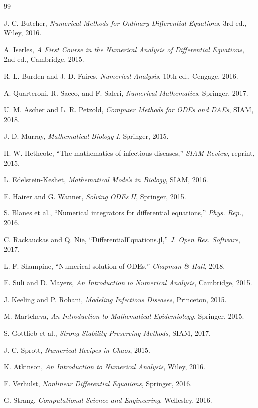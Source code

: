 \documentclass{article}
\begin{document}
\begin{thebibliography}{99}

J. C. Butcher,
\textit{Numerical Methods for Ordinary Differential Equations},
3rd ed., Wiley, 2016.

A. Iserles,
\textit{A First Course in the Numerical Analysis of Differential Equations},
2nd ed., Cambridge, 2015.

R. L. Burden and J. D. Faires,
\textit{Numerical Analysis},
10th ed., Cengage, 2016.

A. Quarteroni, R. Sacco, and F. Saleri,
\textit{Numerical Mathematics},
Springer, 2017.

U. M. Ascher and L. R. Petzold,
\textit{Computer Methods for ODEs and DAEs},
SIAM, 2018.

J. D. Murray,
\textit{Mathematical Biology I},
Springer, 2015.

H. W. Hethcote,
``The mathematics of infectious diseases,''
\textit{SIAM Review}, reprint, 2015.

L. Edelstein-Keshet,
\textit{Mathematical Models in Biology},
SIAM, 2016.

E. Hairer and G. Wanner,
\textit{Solving ODEs II},
Springer, 2015.

S. Blanes et al.,
``Numerical integrators for differential equations,''
\textit{Phys. Rep.}, 2016.

C. Rackauckas and Q. Nie,
``DifferentialEquations.jl,'' 
\textit{J. Open Res. Software}, 2017.

L. F. Shampine,
``Numerical solution of ODEs,''
\textit{Chapman \& Hall}, 2018.

E. Süli and D. Mayers,
\textit{An Introduction to Numerical Analysis},
Cambridge, 2015.

J. Keeling and P. Rohani,
\textit{Modeling Infectious Diseases},
Princeton, 2015.

M. Martcheva,
\textit{An Introduction to Mathematical Epidemiology},
Springer, 2015.

S. Gottlieb et al.,
\textit{Strong Stability Preserving Methods},
SIAM, 2017.

J. C. Sprott,
\textit{Numerical Recipes in Chaos},
2015.

K. Atkinson,
\textit{An Introduction to Numerical Analysis},
Wiley, 2016.

F. Verhulst,
\textit{Nonlinear Differential Equations},
Springer, 2016.

G. Strang,
\textit{Computational Science and Engineering},
Wellesley, 2016.

\end{thebibliography}
\newpage{}
\end{document}
